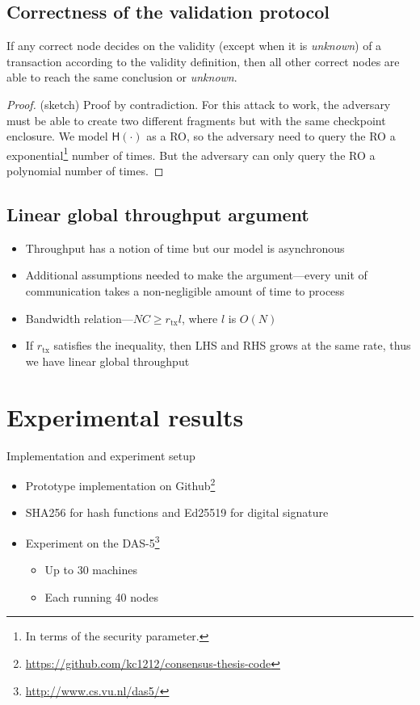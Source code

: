 \documentclass{beamer}
\begin{document}
\subsection{Correctness of the validation protocol}
\begin{frame}{\subsecname}
\begin{theorem}
If any correct node decides on the validity (except when it is \emph{unknown}) of a transaction according to the validity definition,
then all other correct nodes are able to reach the same conclusion or \emph{unknown}.
\end{theorem}
\begin{proof}(sketch)
Proof by contradiction.
For this attack to work, the adversary must be able to create two different fragments but with the same checkpoint enclosure.
We model $\textsf{H}(\cdot)$ as a RO, so the adversary need to query the RO a exponential\footnote{In terms of the security parameter.} number of times.
But the adversary can only query the RO a polynomial number of times.
\end{proof}
\end{frame}

\subsection{Linear global throughput argument}
\begin{frame}{\subsecname}
\begin{itemize}
  \item Throughput has a notion of time but our model is asynchronous
  \item Additional assumptions needed to make the argument---every unit of communication takes a non-negligible amount of time to process
  \item Bandwidth relation---$NC \ge r_{\text{tx}} l$, where $l$ is $O(N)$
  \item If $r_\text{tx}$ satisfies the inequality, then LHS and RHS grows at the same rate,
  thus we have linear global throughput
\end{itemize}
\end{frame}

\section{Experimental results}
\begin{frame}{Implementation and experiment setup}
  \begin{itemize}
    \item Prototype implementation on Github\footnote{\url{https://github.com/kc1212/consensus-thesis-code}}
    \item SHA256 for hash functions and Ed25519 for digital signature
    \item Experiment on the DAS-5\footnote{\url{http://www.cs.vu.nl/das5/}}
      \begin{itemize}
        \item Up to 30 machines
        \item Each running 40 nodes
      \end{itemize}
  \end{itemize}
\end{frame}
\end{document}
